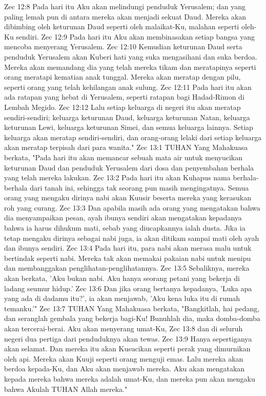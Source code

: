 Zec 12:8  Pada hari itu Aku akan melindungi penduduk Yerusalem; dan yang paling lemah pun di antara mereka akan menjadi sekuat Daud. Mereka akan dibimbing oleh keturunan Daud seperti oleh malaikat-Ku, malahan seperti oleh-Ku sendiri.
Zec 12:9  Pada hari itu Aku akan membinasakan setiap bangsa yang mencoba menyerang Yerusalem.
Zec 12:10  Kemudian keturunan Daud serta penduduk Yerusalem akan Kuberi hati yang suka mengasihani dan suka berdoa. Mereka akan memandang dia yang telah mereka tikam dan meratapinya seperti orang meratapi kematian anak tunggal. Mereka akan meratap dengan pilu, seperti orang yang telah kehilangan anak sulung.
Zec 12:11  Pada hari itu akan ada ratapan yang hebat di Yerusalem, seperti ratapan bagi Hadad-Rimon di Lembah Megido.
Zec 12:12  Lalu setiap keluarga di negeri itu akan meratap sendiri-sendiri; keluarga keturunan Daud, keluarga keturunan Natan, keluarga keturunan Lewi, keluarga keturunan Simei, dan semua keluarga lainnya. Setiap keluarga akan meratap sendiri-sendiri, dan orang-orang lelaki dari setiap keluarga akan meratap terpisah dari para wanita."
Zec 13:1  TUHAN Yang Mahakuasa berkata, "Pada hari itu akan memancar sebuah mata air untuk menyucikan keturunan Daud dan penduduk Yerusalem dari dosa dan penyembahan berhala yang telah mereka lakukan.
Zec 13:2  Pada hari itu akan Kuhapus nama berhala-berhala dari tanah ini, sehingga tak seorang pun masih mengingatnya. Semua orang yang mengaku dirinya nabi akan Kuusir beserta mereka yang kerasukan roh yang curang.
Zec 13:3  Dan apabila masih ada orang yang mengatakan bahwa dia menyampaikan pesan, ayah ibunya sendiri akan mengatakan kepadanya bahwa ia harus dihukum mati, sebab yang diucapkannya ialah dusta. Jika ia tetap mengaku dirinya sebagai nabi juga, ia akan ditikam sampai mati oleh ayah dan ibunya sendiri.
Zec 13:4  Pada hari itu, para nabi akan merasa malu untuk bertindak seperti nabi. Mereka tak akan memakai pakaian nabi untuk menipu dan membanggakan penglihatan-penglihatannya.
Zec 13:5  Sebaliknya, mereka akan berkata, 'Aku bukan nabi. Aku hanya seorang petani yang bekerja di ladang seumur hidup.'
Zec 13:6  Dan jika orang bertanya kepadanya, 'Luka apa yang ada di dadamu itu?', ia akan menjawab, 'Aku kena luka itu di rumah temanku.'"
Zec 13:7  TUHAN Yang Mahakuasa berkata, "Bangkitlah, hai pedang, dan seranglah gembala yang bekerja bagi-Ku! Bunuhlah dia, maka domba-domba akan tercerai-berai. Aku akan menyerang umat-Ku,
Zec 13:8  dan di seluruh negeri dua pertiga dari penduduknya akan tewas.
Zec 13:9  Hanya sepertiganya akan selamat. Dan mereka itu akan Kusucikan seperti perak yang dimurnikan oleh api. Mereka akan Kuuji seperti orang menguji emas. Lalu mereka akan berdoa kepada-Ku, dan Aku akan menjawab mereka. Aku akan mengatakan kepada mereka bahwa mereka adalah umat-Ku, dan mereka pun akan mengaku bahwa Akulah TUHAN Allah mereka."
